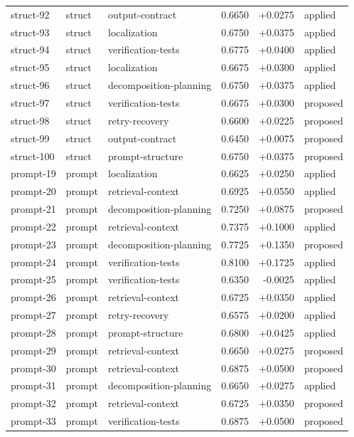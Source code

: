 \begin{center}
\begin{longtable}{llp{5.2cm}rrl}
struct-92 & struct & output-contract & 0.6650 & +0.0275 & applied \\
struct-93 & struct & localization & 0.6750 & +0.0375 & applied \\
struct-94 & struct & verification-tests & 0.6775 & +0.0400 & applied \\
struct-95 & struct & localization & 0.6675 & +0.0300 & applied \\
struct-96 & struct & decomposition-planning & 0.6750 & +0.0375 & applied \\
struct-97 & struct & verification-tests & 0.6675 & +0.0300 & proposed \\
struct-98 & struct & retry-recovery & 0.6600 & +0.0225 & proposed \\
struct-99 & struct & output-contract & 0.6450 & +0.0075 & proposed \\
struct-100 & struct & prompt-structure & 0.6750 & +0.0375 & proposed \\
prompt-19 & prompt & localization & 0.6625 & +0.0250 & applied \\
prompt-20 & prompt & retrieval-context & 0.6925 & +0.0550 & applied \\
prompt-21 & prompt & decomposition-planning & 0.7250 & +0.0875 & proposed \\
prompt-22 & prompt & retrieval-context & 0.7375 & +0.1000 & applied \\
prompt-23 & prompt & decomposition-planning & 0.7725 & +0.1350 & proposed \\
prompt-24 & prompt & verification-tests & 0.8100 & +0.1725 & applied \\
prompt-25 & prompt & verification-tests & 0.6350 & -0.0025 & applied \\
prompt-26 & prompt & retrieval-context & 0.6725 & +0.0350 & applied \\
prompt-27 & prompt & retry-recovery & 0.6575 & +0.0200 & applied \\
prompt-28 & prompt & prompt-structure & 0.6800 & +0.0425 & applied \\
prompt-29 & prompt & retrieval-context & 0.6650 & +0.0275 & proposed \\
prompt-30 & prompt & retrieval-context & 0.6875 & +0.0500 & proposed \\
prompt-31 & prompt & decomposition-planning & 0.6650 & +0.0275 & applied \\
prompt-32 & prompt & retrieval-context & 0.6725 & +0.0350 & proposed \\
prompt-33 & prompt & verification-tests & 0.6875 & +0.0500 & proposed \\

\end{longtable}
\end{center}
